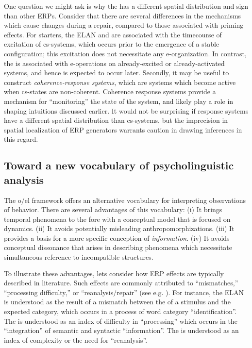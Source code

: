 One question we might ask is why the  has a different spatial distribution and sign than other ERPs. Consider that there are several differences in the mechanisms which cause  changes during a repair, compared to those associated with priming effects. For starters, the ELAN and  are associated with the timecourse of excitation of cs-systems, which occurs prior to the emergence of a stable configuration; this excitation does not necessitate any e-organization. In contrast, the  is associated with e-operations on already-excited or already-activated systems, and hence is expected to occur later. Secondly, it may be useful to construct \textit{coherence-response systems}, which are systems which become active when cs-states are non-coherent. Coherence response systems provide a mechanism for “monitoring” the state of the system, and likely play a role in shaping  intuitions discussed earlier. It would not be surprising if  response systems have a different spatial distribution than cs-systems, but the imprecision in spatial localization of ERP generators warrants caution in drawing inferences in this regard.

\subsection{Toward a new vocabulary of psycholinguistic analysis}

The o/el framework offers an alternative vocabulary for interpreting  observations of behavior. There are several advantages of this vocabulary: (i) It brings temporal phenomena to the fore with a conceptual model that is focused on dynamics. (ii) It avoids potentially misleading anthropomorphizations. (iii) It provides a basis for a more specific conception of \textit{information}. (iv) It avoids conceptual dissonance that arises in describing phenomena which necessitate simultaneous reference to incompatible structures.

To illustrate these advantages, lets consider how ERP effects are typically described in  literature. Such effects are commonly attributed to “mismatches,” “processing difficulty,” or “reanalysis/repair” (see e.g. \citealt{Friederici2002,KutasFedermeier2011}). For instance, the ELAN is understood as the result of a mismatch between the  of a stimulus and the expected category, which occurs in a process of word category “identification”. The  is understood as an index of difficulty in “processing” which occurs in the “integration” of semantic and syntactic “information”. The  is understood as an index of complexity or the need for “reanalysis”.

